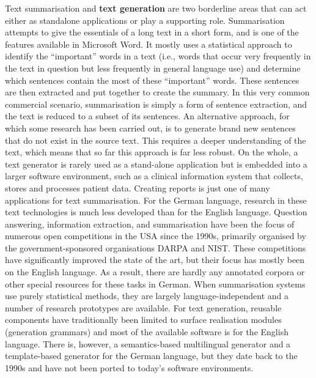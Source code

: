 \documentclass[]{../../metanetpaper}
\begin{document}
\begin{Parallel}[c]{79mm}{78mm}
{    Text summarisation and \textbf{text generation} are two borderline areas that can act either as standalone applications or play a supporting role. Summarisation attempts to give the essentials of a long text in a short form, and is one of the features available in Microsoft Word. It mostly uses a statistical approach to identify the “important” words in a text (i.e., words that occur very frequently in the text in question but less frequently in general language use) and determine which sentences contain the most of these “important” words. These sentences are then extracted and put together to create the summary. In this very common commercial scenario, summarisation is simply a form of sentence extraction, and the text is reduced to a subset of its sentences. An alternative approach, for which some research has been carried out, is to generate brand new sentences that do not exist in the source text.   This requires a deeper understanding of the text, which means that so far this approach is far less robust. On the whole, a text generator is rarely used as a stand-alone application but is embedded into a larger software environment, such as a clinical information system that collects, stores and processes patient data. Creating reports is just one of many applications for text summarisation. 
For the German language, research in these text technologies is much less developed than for the English language. Question answering, information extraction, and summarisation have been the focus of numerous open competitions in the USA since the 1990s, primarily organised by the government-sponsored organisations DARPA and NIST. These competitions have significantly improved the state of the art, but their focus has mostly been on the English language. As a result, there are hardly any annotated corpora or other special resources for these tasks in German. When summarisation systems use purely statistical methods, they are largely language-independent and a number of research prototypes are available. For text generation, reusable components have traditionally been limited to surface realisation modules (generation grammars) and most of the available software is for the English language. There is, however, a semantics-based multilingual generator and a template-based generator for the German language, but they date back to the 1990s and have not been ported to today’s software environments.
  }
  
  \ParallelPar



\end{Parallel}
\end{document}
